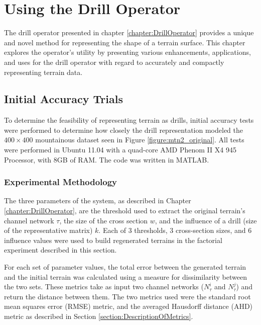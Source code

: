 \chapter{Using the Drill Operator}
\label{chapter:UsingTheDrillOperator}

The drill operator presented in chapter \ref{chapter:DrillOperator} provides a unique and novel method for representing the shape of a terrain surface. This chapter explores the operator's utility 
by presenting various enhancements, applications, and uses for the drill operator with regard to accurately and compactly representing terrain data.


\section{Initial Accuracy Trials}
\label{section:DrillAccuracyTests}

To determine the feasibility of representing terrain as drills, initial accuracy tests were performed to determine how closely the drill representation modeled the $400 \times 400$ mountainous dataset seen in Figure \ref{figure:mtn2_original}. All tests were performed in Ubuntu 11.04 with a quad-core AMD Phenom II X4 945 Processor, with 8GB of RAM. The code was written in MATLAB.

\subsection{Experimental Methodology}

The three parameters of the system, as described in Chapter \ref{chapter:DrillOperator}, are the threshold used to extract the original terrain's channel network $\tau$, the size of the cross section $w$, and the influence of a drill (size of the representative matrix) $k$. Each of 3 thresholds, 3 cross-section sizes, and 6 influence values were used to build regenerated terrains in the factorial experiment described in this section. 

For each set of parameter values, the total error between the generated terrain and the initial terrain was calculated using a measure for dissimilarity between the two sets.
These metrics take as input two channel networks
($N^{i}_{\tau}$ and $N^{j}_{\tau}$) and return the distance between
them.
 The two metrics used were the standard root mean squares error (RMSE) metric, and the averaged Hausdorff distance (AHD) metric as described in Section \ref{section:DescriptionOfMetrics}.

